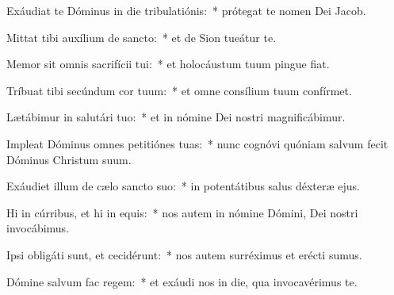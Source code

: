 \item Exáudiat te Dóminus in die tribulatiónis:~* prótegat te nomen Dei Jacob.

\item Mittat tibi auxílium de sancto:~* et de Sion tueátur te.

\item Memor sit omnis sacrifícii tui:~* et holocáustum tuum pingue fiat.

\item Tríbuat tibi secúndum cor tuum:~* et omne consílium tuum confírmet.

\item Lætábimur in salutári tuo:~* et in nómine Dei nostri magnificábimur.

\item Impleat Dóminus omnes petitiónes tuas:~* nunc cognóvi quóniam salvum fecit Dóminus Christum suum.

\item Exáudiet illum de cælo sancto suo:~* in potentátibus salus déxteræ ejus.

\item Hi in cúrribus, et hi in equis:~* nos autem in nómine Dómini, Dei nostri invocábimus.

\item Ipsi obligáti sunt, et cecidérunt:~* nos autem surréximus et erécti sumus.

\item Dómine salvum fac regem:~* et exáudi nos in die, qua invocavérimus te.

